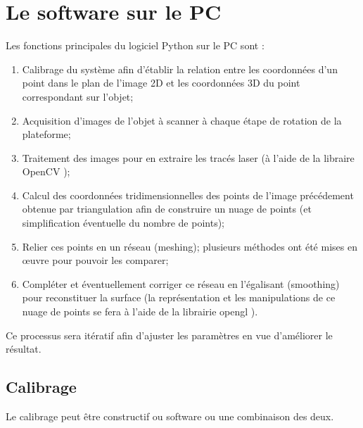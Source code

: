 \documentclass[a4paper,10pt]{report}
\begin{document}
\section{Le software sur le PC}
Les fonctions principales du logiciel Python sur le PC sont :
\begin{enumerate}
\item Calibrage du système afin d'établir la relation entre les coordonnées d'un point dans le plan de l'image 2D et les coordonnées 3D du point correspondant sur l'objet;
\item Acquisition d'images de l'objet à scanner à chaque étape de rotation de la plateforme;
\item Traitement des images pour en extraire les tracés laser (à l'aide de la libraire OpenCV \cite{openCV});
\item Calcul des coordonnées tridimensionnelles des points de l'image précédement obtenue par triangulation afin de construire un nuage de points (et simplification éventuelle du nombre de points);
\item Relier ces points en un réseau (meshing); plusieurs méthodes ont été mises en \oe uvre pour pouvoir les comparer;
\item Compléter et éventuellement corriger ce réseau en l'égalisant (smoothing) pour reconstituer la surface (la représentation et les manipulations de ce nuage de points se fera à l'aide de la librairie opengl \cite{opengl}).
\end{enumerate}
Ce processus sera itératif afin d'ajuster les paramètres en vue d'améliorer le résultat.

\subsection{Calibrage}
Le calibrage peut être constructif ou software ou une combinaison des deux.
\end{document}
